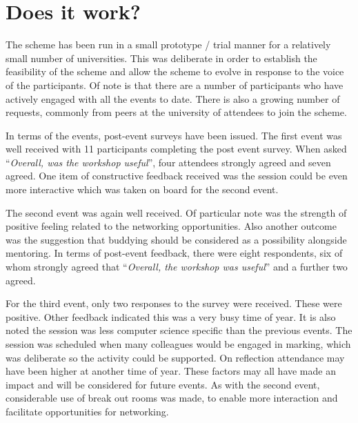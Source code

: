 \documentclass[sigconf]{acmart}
\begin{document}
\section{Does it work?}	
\label{Sec:DoesItWork}
The scheme has been run in a small prototype / trial manner for a
relatively small number of universities. This was deliberate in order
to establish the feasibility of the scheme and allow the scheme to
evolve in response to the voice of the participants. Of note is that
there are a number of participants who have actively engaged with all
the events to date. There is also a growing number of requests,
commonly from peers at the university of attendees to join the scheme.

In terms of the events, post-event surveys have been issued. The first
event was well received with 11 participants completing the post event
survey. When asked ``{\emph{Overall, was the workshop useful}}'', four
attendees strongly agreed and seven agreed. One item of constructive
feedback received was the session could be even more interactive which
was taken on board for the second event.

The second event was again well received. Of particular note was the
strength of positive feeling related to the networking
opportunities. Also another outcome was the suggestion that buddying
should be considered as a possibility alongside mentoring. In terms of
post-event feedback, there were eight respondents, six of whom
strongly agreed that ``{\emph{Overall, the workshop was useful}}'' and
a further two agreed.

For the third event, only two responses to the survey were
received. These were positive. Other feedback indicated this was a
very busy time of year. It is also noted the session was less computer
science specific than the previous events. The session was scheduled
when many colleagues would be engaged in marking, which was deliberate
so the activity could be supported. On reflection attendance may have
been higher at another time of year. These factors may all have made
an impact and will be considered for future events. As with the second
event, considerable use of break out rooms was made, to enable more
interaction and facilitate opportunities for networking.

\begin{comment}
TO DO - evaluation of Mentoring - PH what is needed here? Is sufficient to indicate the first pilot of 10 Mentees has been established? Or do we need feedback from the participants?
\end{comment}
\end{document}
